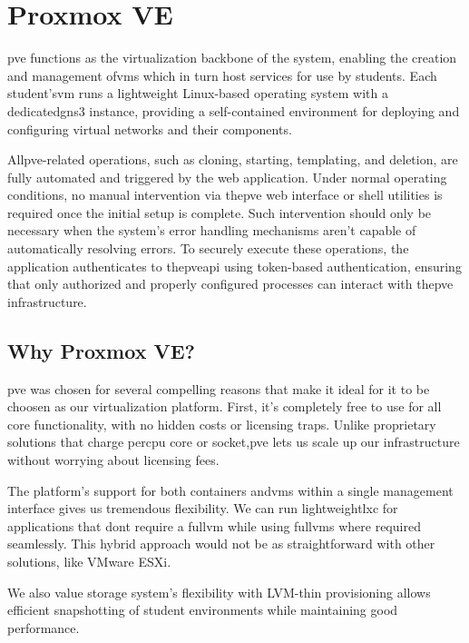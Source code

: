 \section{Proxmox VE}

    \ac{pve} functions as the virtualization backbone of the system, enabling the creation and management of\ac{vm}s 
    which in turn host services for use by students. Each student's\ac{vm} runs a lightweight Linux-based operating system with a 
    dedicated\ac{gns3} instance, providing a self-contained environment for deploying and configuring virtual networks 
    and their components.

    All\ac{pve}-related operations, such as cloning, starting, templating, and deletion, are fully automated and triggered by the 
    web application. Under normal operating conditions, no manual intervention via the\ac{pve} web interface or shell utilities 
    is required once the initial setup is complete. Such intervention should only be necessary when the system's error handling 
    mechanisms aren't capable of automatically resolving errors. To securely execute these operations, the application 
    authenticates to the\ac{pve}\ac{api} using token-based authentication, ensuring that only authorized and properly configured 
    processes can interact with the\ac{pve} infrastructure.


    \subsection{Why Proxmox VE?}

        \ac{pve} was chosen for several compelling reasons that make it ideal for it to be choosen as our virtualization platform. First, 
        it's completely free to use for all core functionality, with no hidden costs or licensing traps. Unlike proprietary solutions that 
        charge per\ac{cpu} core or socket,\ac{pve} lets us scale up our infrastructure without worrying about licensing fees.

        The platform's support for both containers and\ac{vm}s within a single management interface gives us tremendous flexibility. We 
        can run lightweight\ac{lxc} for applications that dont require a full\ac{vm} while using full\ac{vm}s where required seamlessly. 
        This hybrid approach would not be as straightforward with other solutions, like VMware ESXi.

        We also value storage system's flexibility with LVM-thin provisioning allows efficient snapshotting of student environments while 
        maintaining good performance.

